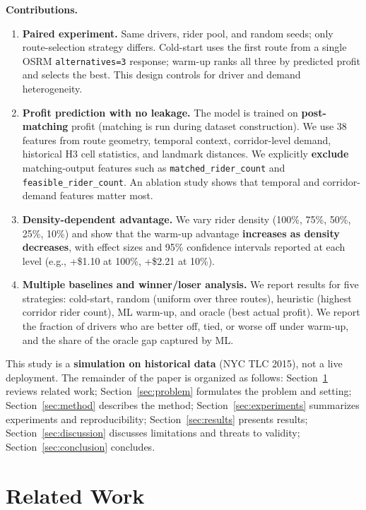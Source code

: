 \documentclass[11pt,a4paper]{article}
\begin{document}
\textbf{Contributions.}
\begin{enumerate}
\item \textbf{Paired experiment.} Same drivers, rider pool, and random seeds; only route-selection strategy differs. Cold-start uses the first route from a single OSRM \texttt{alternatives=3} response; warm-up ranks all three by predicted profit and selects the best. This design controls for driver and demand heterogeneity.
\item \textbf{Profit prediction with no leakage.} The model is trained on \textbf{post-matching} profit (matching is run during dataset construction). We use 38 features from route geometry, temporal context, corridor-level demand, historical H3 cell statistics, and landmark distances. We explicitly \textbf{exclude} matching-output features such as \texttt{matched\_rider\_count} and \texttt{feasible\_rider\_count}. An ablation study shows that temporal and corridor-demand features matter most.
\item \textbf{Density-dependent advantage.} We vary rider density (100\%, 75\%, 50\%, 25\%, 10\%) and show that the warm-up advantage \textbf{increases as density decreases}, with effect sizes and 95\% confidence intervals reported at each level (e.g., +\$1.10 at 100\%, +\$2.21 at 10\%).
\item \textbf{Multiple baselines and winner/loser analysis.} We report results for five strategies: cold-start, random (uniform over three routes), heuristic (highest corridor rider count), ML warm-up, and oracle (best actual profit). We report the fraction of drivers who are better off, tied, or worse off under warm-up, and the share of the oracle gap captured by ML.
\end{enumerate}

This study is a \textbf{simulation on historical data} (NYC TLC 2015), not a live deployment. The remainder of the paper is organized as follows: Section~\ref{sec:related} reviews related work; Section~\ref{sec:problem} formulates the problem and setting; Section~\ref{sec:method} describes the method; Section~\ref{sec:experiments} summarizes experiments and reproducibility; Section~\ref{sec:results} presents results; Section~\ref{sec:discussion} discusses limitations and threats to validity; Section~\ref{sec:conclusion} concludes.

\section{Related Work}
\label{sec:related}
\end{document}
